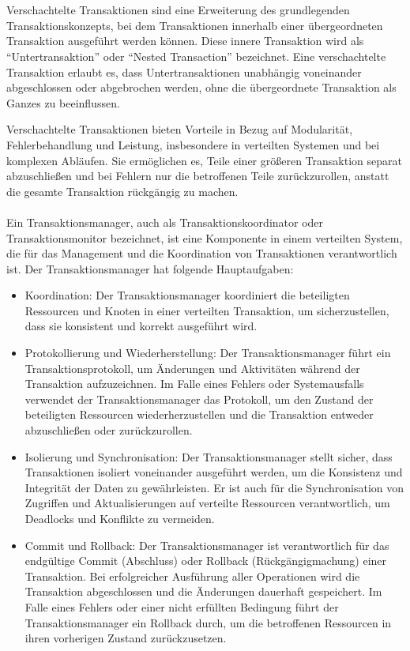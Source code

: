 \documentclass[../vs-script-first-v01.tex]{subfiles}
\begin{document}
\\\\
Verschachtelte Transaktionen sind eine Erweiterung des grundlegenden Transaktionskonzepts, bei dem Transaktionen innerhalb einer übergeordneten Transaktion ausgeführt werden können. Diese innere Transaktion wird als \enquote{Untertransaktion} oder \enquote{Nested Transaction} bezeichnet. Eine verschachtelte Transaktion erlaubt es, dass Untertransaktionen unabhängig voneinander abgeschlossen oder abgebrochen werden, ohne die übergeordnete Transaktion als Ganzes zu beeinflussen.

Verschachtelte Transaktionen bieten Vorteile in Bezug auf Modularität, Fehlerbehandlung und Leistung, insbesondere in verteilten Systemen und bei komplexen Abläufen. Sie ermöglichen es, Teile einer größeren Transaktion separat abzuschließen und bei Fehlern nur die betroffenen Teile zurückzurollen, anstatt die gesamte Transaktion rückgängig zu machen.
\\\\
Ein Transaktionsmanager, auch als Transaktionskoordinator oder Transaktionsmonitor bezeichnet, ist eine Komponente in einem verteilten System, die für das Management und die Koordination von Transaktionen verantwortlich ist. Der Transaktionsmanager hat folgende Hauptaufgaben:
\begin{itemize}
\item Koordination: Der Transaktionsmanager koordiniert die beteiligten Ressourcen und Knoten in einer verteilten Transaktion, um sicherzustellen, dass sie konsistent und korrekt ausgeführt wird.
\item Protokollierung und Wiederherstellung: Der Transaktionsmanager führt ein Transaktionsprotokoll, um Änderungen und Aktivitäten während der Transaktion aufzuzeichnen. Im Falle eines Fehlers oder Systemausfalls verwendet der Transaktionsmanager das Protokoll, um den Zustand der beteiligten Ressourcen wiederherzustellen und die Transaktion entweder abzuschließen oder zurückzurollen.
\item Isolierung und Synchronisation: Der Transaktionsmanager stellt sicher, dass Transaktionen isoliert voneinander ausgeführt werden, um die Konsistenz und Integrität der Daten zu gewährleisten. Er ist auch für die Synchronisation von Zugriffen und Aktualisierungen auf verteilte Ressourcen verantwortlich, um Deadlocks und Konflikte zu vermeiden.
\item Commit und Rollback: Der Transaktionsmanager ist verantwortlich für das endgültige Commit (Abschluss) oder Rollback (Rückgängigmachung) einer Transaktion. Bei erfolgreicher Ausführung aller Operationen wird die Transaktion abgeschlossen und die Änderungen dauerhaft gespeichert. Im Falle eines Fehlers oder einer nicht erfüllten Bedingung führt der Transaktionsmanager ein Rollback durch, um die betroffenen Ressourcen in ihren vorherigen Zustand zurückzusetzen.
\end{itemize}
\end{document}
